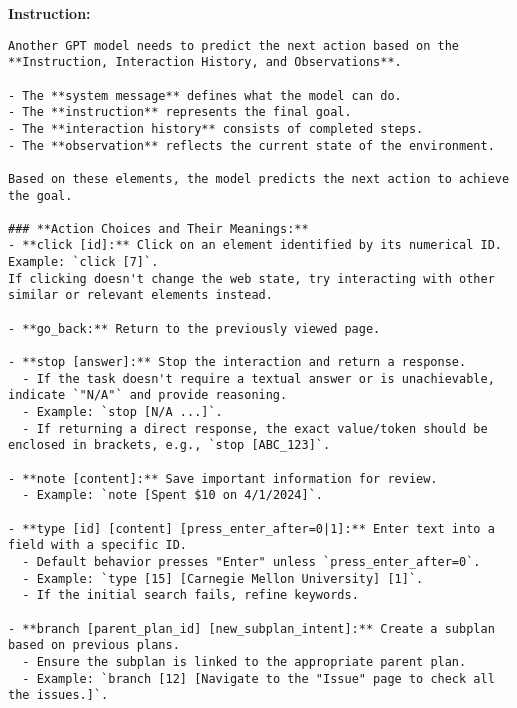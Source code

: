 
\begin{tcolorbox}[breakable]
\small
\ttfamily
{}

\textbf{Instruction:} 
\begin{lstlisting}
Another GPT model needs to predict the next action based on the **Instruction, Interaction History, and Observations**.  

- The **system message** defines what the model can do.  
- The **instruction** represents the final goal.  
- The **interaction history** consists of completed steps.  
- The **observation** reflects the current state of the environment.  

Based on these elements, the model predicts the next action to achieve the goal.

### **Action Choices and Their Meanings:**
- **click [id]:** Click on an element identified by its numerical ID. Example: `click [7]`.  
If clicking doesn't change the web state, try interacting with other similar or relevant elements instead.

- **go_back:** Return to the previously viewed page.

- **stop [answer]:** Stop the interaction and return a response.  
  - If the task doesn't require a textual answer or is unachievable, indicate `"N/A"` and provide reasoning.  
  - Example: `stop [N/A ...]`.  
  - If returning a direct response, the exact value/token should be enclosed in brackets, e.g., `stop [ABC_123]`.

- **note [content]:** Save important information for review.  
  - Example: `note [Spent $10 on 4/1/2024]`.

- **type [id] [content] [press_enter_after=0|1]:** Enter text into a field with a specific ID.  
  - Default behavior presses "Enter" unless `press_enter_after=0`.  
  - Example: `type [15] [Carnegie Mellon University] [1]`.  
  - If the initial search fails, refine keywords.

- **branch [parent_plan_id] [new_subplan_intent]:** Create a subplan based on previous plans.  
  - Ensure the subplan is linked to the appropriate parent plan.  
  - Example: `branch [12] [Navigate to the "Issue" page to check all the issues.]`.


\end{lstlisting}
\end{tcolorbox}
